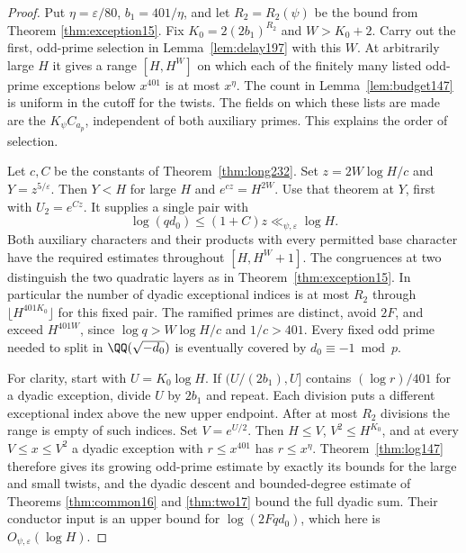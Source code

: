 \documentclass[a4paper,11pt]{article}
\theoremstyle{definition}
\theoremstyle{remark}
\numberwithin{equation}{section}
\begin{document}
\begin{proof}
Put \(\eta=\varepsilon/80\), \(b_1=401/\eta\), and let
\(R_2=R_2(\psi)\) be the bound from Theorem
\ref{thm:exception15}. Fix
\(K_0=2(2b_1)^{R_2}\) and \(W>K_0+2\).
Carry out the first, odd-prime selection in
Lemma~\ref{lem:delay197} with this \(W\). At arbitrarily large
\(H\) it gives a range \([H,H^W]\) on which each of the finitely
many listed odd-prime exceptions below \(x^{401}\) is at most
\(x^\eta\). The count in Lemma~\ref{lem:budget147} is uniform
in the cutoff for the twists. The fields on which these lists are
made are the \(K_\psi C_{a_p}\), independent of both auxiliary
primes. This explains the order of selection.

Let \(c,C\) be the constants of Theorem~\ref{thm:long232}.
Set \(z=2W\log H/c\) and \(Y=z^{5/\varepsilon}\).
Then \(Y<H\) for large \(H\) and \(e^{cz}=H^{2W}\).
Use that theorem at \(Y\), first with \(U_2=e^{Cz}\).
It supplies a single pair with
\[
       \log(qd_0)\le(1+C)z\ll_{\psi,\varepsilon}\log H.
\]
Both auxiliary characters and their products with every permitted
base character have the required estimates throughout
\([H,H^W+1]\). The congruences at two distinguish the two
quadratic layers as in Theorem~\ref{thm:exception15}.
In particular the number of dyadic exceptional indices is at most
\(R_2\) through \(\lfloor H^{401K_0}\rfloor\) for this fixed
pair. The ramified primes are distinct, avoid \(2F\), and exceed
\(H^{401W}\), since \(\log q>W\log H/c\) and \(1/c>401\).
Every fixed odd prime needed to split in
\(\QQ(\sqrt{-d_0})\) is eventually covered by \(d_0\equiv-1\bmod p\).

For clarity, start with \(U=K_0\log H\). If
\((U/(2b_1),U]\) contains \((\log r)/401\) for a dyadic
exception, divide \(U\) by \(2b_1\) and repeat. Each division
puts a different exceptional index above the new upper endpoint.
After at most \(R_2\) divisions the range is empty of such indices.
Set \(V=e^{U/2}\). Then \(H\le V\), \(V^2\le H^{K_0}\), and at
every \(V\le x\le V^2\) a dyadic exception with
\(r\le x^{401}\) has \(r\le x^\eta\).
Theorem~\ref{thm:log147} therefore gives its growing odd-prime
estimate by exactly its bounds for the large and small twists,
and the dyadic descent and bounded-degree estimate of Theorems
\ref{thm:common16} and
\ref{thm:two17} bound the full dyadic sum.
Their conductor input is an upper bound for \(\log(2Fqd_0)\),
which here is \(O_{\psi,\varepsilon}(\log H)\).


\end{proof}
\end{document}
